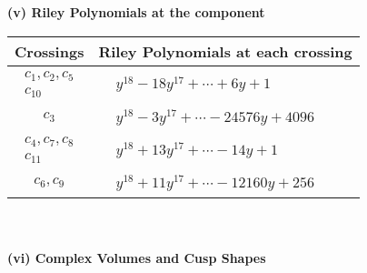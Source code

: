 \documentclass[1p]{elsarticle_modified}
\theoremstyle{definition}
\begin{document}
\newpage\renewcommand{\arraystretch}{1}
\flushleft \textbf{(v) Riley Polynomials at the component}\newline \\
\begin{tabular}{m{50pt}|m{274pt}}
Crossings & \hspace{64pt}Riley Polynomials at each crossing \\
\hline $$\begin{aligned}c_{1},c_{2},c_{5}\\c_{10}\end{aligned}$$&$\begin{aligned}
&y^{18}-18 y^{17}+\cdots+6 y+1
\end{aligned}$\\
\hline $$\begin{aligned}c_{3}\end{aligned}$$&$\begin{aligned}
&y^{18}-3 y^{17}+\cdots-24576 y+4096
\end{aligned}$\\
\hline $$\begin{aligned}c_{4},c_{7},c_{8}\\c_{11}\end{aligned}$$&$\begin{aligned}
&y^{18}+13 y^{17}+\cdots-14 y+1
\end{aligned}$\\
\hline $$\begin{aligned}c_{6},c_{9}\end{aligned}$$&$\begin{aligned}
&y^{18}+11 y^{17}+\cdots-12160 y+256
\end{aligned}$\\
\hline
\end{tabular}\\~\\
\newpage\flushleft \textbf{(vi) Complex Volumes and Cusp Shapes}
\end{document}

